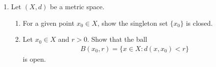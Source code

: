 \documentclass[10pt,a4paper]{report}
\begin{document}
\begin{enumerate}[label=\Roman*.]
\begin{enumerate}[label=(\alph*)]
\end{enumerate}

\item Let $(X,d)$ be a metric space.
\begin{enumerate}[label=(\alph*)]
\item For a given point $x_0 \in X$, show the singleton set $\{x_0\}$ is closed.
\item Let $x_0 \in X$ and $r > 0$.  Show that the ball 
\begin{align*}
	B(x_0,r) = \{x \in X: d(x,x_0) < r\}
\end{align*}is open.
\end{enumerate}

\end{enumerate}
\end{document}
